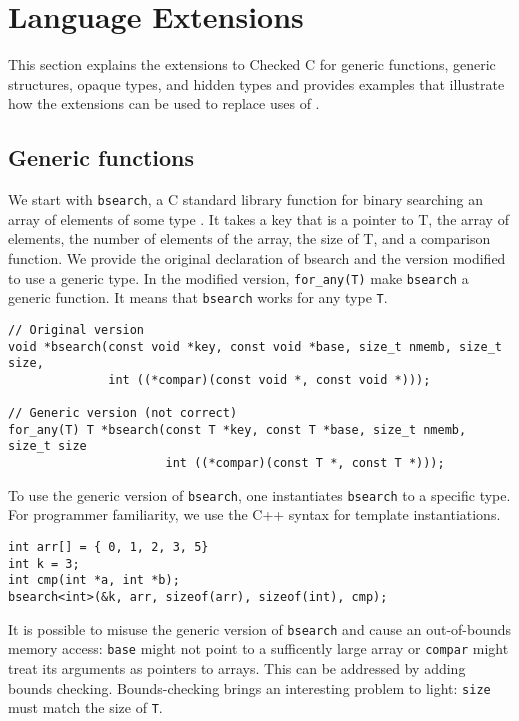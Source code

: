 \section{Language Extensions}
This section explains the extensions to Checked C for 
generic functions, generic structures, opaque types, and hidden types
and provides examples that illustrate how the extensions can be used to
replace uses of \uncheckedptrvoid{}.

\subsection{Generic functions}
\label{sec:functions}
We start with \lstinline+bsearch+, a C standard library function for binary
searching an array of elements of some type .  It
takes a key that is a pointer to T, the array of elements, the number of elements of
the array, the size of T, and a comparison function.  We provide the original declaration
of bsearch and the version modified to use a generic type.  In the modified version,
\lstinline+for_any(T)+ make \lstinline+bsearch+ a generic function.  It means that
\lstinline+bsearch+ works for  any type \lstinline+T+.
\begin{lstlisting}
// Original version
void *bsearch(const void *key, const void *base, size_t nmemb, size_t size,
              int ((*compar)(const void *, const void *)));

// Generic version (not correct)
for_any(T) T *bsearch(const T *key, const T *base, size_t nmemb, size_t size
                      int ((*compar)(const T *, const T *)));
\end{lstlisting}
To use the generic version of \lstinline+bsearch+, one instantiates \lstinline+bsearch+ to
a specific type.  For programmer familiarity, we use the C++ syntax for template
instantiations.
\begin{lstlisting}
int arr[] = { 0, 1, 2, 3, 5}
int k = 3;
int cmp(int *a, int *b);
bsearch<int>(&k, arr, sizeof(arr), sizeof(int), cmp);
\end{lstlisting}

It is possible to misuse the generic version of \lstinline+bsearch+ and cause
an out-of-bounds memory access: \lstinline+base+ might not point to a sufficently
large array or \lstinline+compar+ might treat its arguments as pointers to arrays.
This can be addressed by adding bounds checking.  Bounds-checking brings
an interesting problem to light: \lstinline+size+  must match the size of \lstinline+T+.

